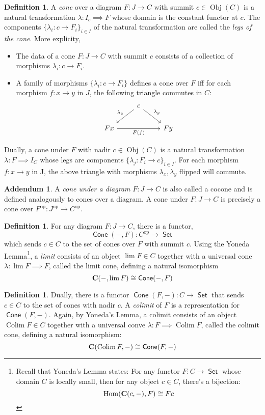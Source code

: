 \documentclass[leqno, openany]{memoir}
\theoremstyle{definition}
\newtheorem{defn}[thm]{Definition}
\newtheorem{addm}[thm]{Addendum}
\theoremstyle{remark}
\theoremstyle{plain}
\theoremstyle{definition}
\theoremstyle{remark}
\newcommand{\iso}{\cong}
\newcommand{\opp}{^\text{op}}
\DeclareMathOperator{\Sets}{\mathsf{Set}}
\DeclareMathOperator{\Obj}{Obj}
\DeclareMathOperator{\Hom}{Hom}
\DeclareMathOperator{\Cone}{\mathsf{Cone}}
\DeclareMathOperator{\colim}{Colim}
\begin{document}
\begin{defn}
    A \emph{cone} over a diagram $F: J \to C$ with summit $c \in \Obj(C)$ is a natural transformation $\lambda: I_c \implies F$ whose domain is the constant functor at $c$. The components $\{\lambda_i: c \to F_i\}_{i \in I}$ of the natural transformation are called the \emph{legs of the cone}. More explicity,
    \begin{itemize}
        \item The data of a cone $F: J \to C$ with summit $c$ consists of a collection of morphisms $\lambda_i: c \to F_i$. 
        \item A family of morphisms $\{\lambda_i: c \to F_i\}$ defines a cone over $F$ iff for each morphism $f: x \to y$ in $J$, the following triangle commutes in $C$:
        \[\begin{tikzcd}
            & c \ar[dl, "\lambda_x", swap] \ar[dr, "\lambda_y"]& \\
            Fx \ar[rr, "F(f)", swap] &  & Fy
        \end{tikzcd}\]
    \end{itemize}
    Dually, a cone under $F$ with nadir $c \in \Obj(C)$ is a natural transformation $\lambda: F \implies I_C$ whose legs are components $\{\lambda_j: F_i\to c\}_{i \in I}$. For each morphism $f: x \to y$ in J, the above triangle with morphisms $\lambda_x, \lambda_y$ flipped will commute.
\end{defn}
  \begin{addm}
      A \emph{cone under a diagram} $F: J \to C$ is also called a cocone and is defined analogously to cones over a diagram. A cone under $F: J \to C$ is precisely a cone over $F\opp: J\opp \to C\opp$.
  \end{addm}

\begin{defn}
    For any diagram $F: J \to C$, there is a functor, 
    \[\Cone(-,F): C\opp \to \Sets\]
    which sends $c \in C$ to the set of cones over $F$ with summit $c$. Using the Yoneda Lemma\footnote{Recall that Yoneda's Lemma states: For any functor $F: C \to \Sets$ whose domain $C$ is locally small, then for any object $c \in C$, there's a bijection:
    \[\Hom(\bold{C}(c,-), F) \iso Fc\]}, a \emph{limit} consists of an object $\lim F\in C$ together with a universal cone $\lambda: \lim F \implies F$, called the limit cone, defining a natural isomorphism 
    \[\bold{C}(-,\lim F) \iso \Cone(-,F)\]
\end{defn}

\newpage
\begin{defn}
    Dually, there is a functor $\Cone(F,-): C \to \Sets$ that sends $c \in C$ to the set of cones with nadir $c$. A \emph{colimit} of $F$ is a representation for $\Cone(F,-)$. Again, by Yoneda's Lemma, a colimit consists of an object $\colim F \in C$ together with a universal conve $\lambda: F \implies \colim F$, called the colimit cone, defining a natural isomorphism:
    \[\bold{C}(\colim F, -) \iso \Cone(F, -)\]
\end{defn}
\end{document}
